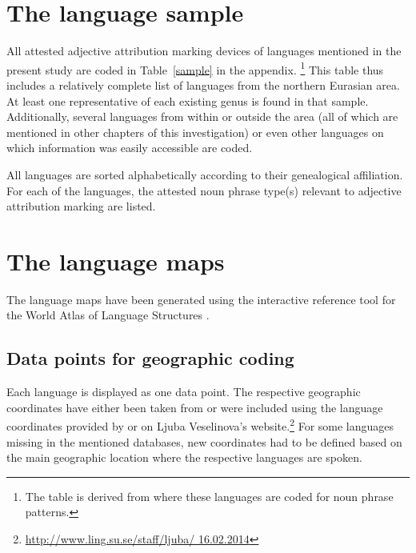 \section{The language sample}
All attested adjective attribution marking devices of languages mentioned in the present study are coded in Table~\ref{sample} in the appendix.
\footnote{The table is derived from \citet{AUTOTYP-NP} where these languages are coded for noun phrase patterns.}
 This table thus includes a relatively complete list of languages from the northern Eurasian area. At least one representative of each existing genus is found in that sample. Additionally, several languages from within or outside the area (all of which are mentioned in other chapters of this investigation) or even other languages on which information was easily accessible are coded.

All languages are sorted alphabetically according to their genealogical affiliation. For each of the languages, the attested noun phrase type(s) relevant to adjective attribution marking are listed.

\section{The language maps}
The language maps have been generated using the interactive reference tool 
for the World Atlas of Language Structures \citep{bibiko2005}. 

\subsection[Geographic coding]{Data points for geographic coding}
Each language is displayed as one data point. The respective geographic coordinates have either been taken from \cite{walsOnline2013} or were included using the language coordinates provided by \cite{AUTOTYP} or on Ljuba Veselinova's website.\footnote{\url{http://www.ling.su.se/staff/ljuba/ 16.02.2014}} For some languages missing in the mentioned databases, new coordinates had to be defined based on the main geographic location where the respective languages are spoken.

